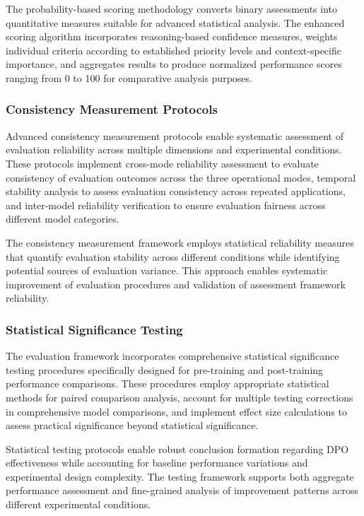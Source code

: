 The probability-based scoring methodology converts binary assessments into quantitative measures suitable for advanced statistical analysis. The enhanced scoring algorithm incorporates reasoning-based confidence measures, weights individual criteria according to established priority levels and context-specific importance, and aggregates results to produce normalized performance scores ranging from 0 to 100 for comparative analysis purposes.

\subsubsection{Consistency Measurement Protocols}

Advanced consistency measurement protocols enable systematic assessment of evaluation reliability across multiple dimensions and experimental conditions. These protocols implement cross-mode reliability assessment to evaluate consistency of evaluation outcomes across the three operational modes, temporal stability analysis to assess evaluation consistency across repeated applications, and inter-model reliability verification to ensure evaluation fairness across different model categories.

The consistency measurement framework employs statistical reliability measures that quantify evaluation stability across different conditions while identifying potential sources of evaluation variance. This approach enables systematic improvement of evaluation procedures and validation of assessment framework reliability.

\subsubsection{Statistical Significance Testing}

The evaluation framework incorporates comprehensive statistical significance testing procedures specifically designed for pre-training and post-training performance comparisons. These procedures employ appropriate statistical methods for paired comparison analysis, account for multiple testing corrections in comprehensive model comparisons, and implement effect size calculations to assess practical significance beyond statistical significance.

Statistical testing protocols enable robust conclusion formation regarding DPO effectiveness while accounting for baseline performance variations and experimental design complexity. The testing framework supports both aggregate performance assessment and fine-grained analysis of improvement patterns across different experimental conditions.

